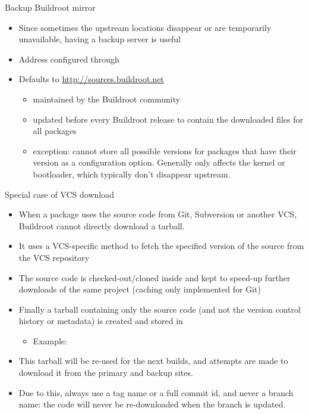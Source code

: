 \begin{frame}{Backup Buildroot mirror}
  \begin{itemize}
  \item Since sometimes the upstream locations disappear or are
    temporarily unavailable, having a backup server is useful
  \item Address configured through 
  \item Defaults to \url{http://sources.buildroot.net}
    \begin{itemize}
    \item maintained by the Buildroot community
    \item updated before every Buildroot release to contain the
      downloaded files for all packages
    \item exception: cannot store all possible versions for packages
      that have their version as a configuration option. Generally
      only affects the kernel or bootloader, which typically don't
      disappear upstream.
    \end{itemize}
  \end{itemize}
\end{frame}

\begin{frame}{Special case of VCS download}
  \begin{itemize}
  \item When a package uses the source code from Git, Subversion or
    another VCS, Buildroot cannot directly download a tarball.
  \item It uses a VCS-specific method to fetch the specified version
    of the source from the VCS repository
  \item The source code is checked-out/cloned inside  and
    kept to speed-up further downloads of the same project (caching
    only implemented for Git)
  \item Finally a tarball containing only the source code (and not the
    version control history or metadata) is created and stored in
    \begin{itemize}
    \item Example: 
    \end{itemize}
  \item This tarball will be re-used for the next builds, and attempts
    are made to download it from the primary and backup sites.
  \item Due to this, always use a tag name or a full commit id, and
    never a branch name: the code will never be re-downloaded when the
    branch is updated.
  \end{itemize}
\end{frame}

